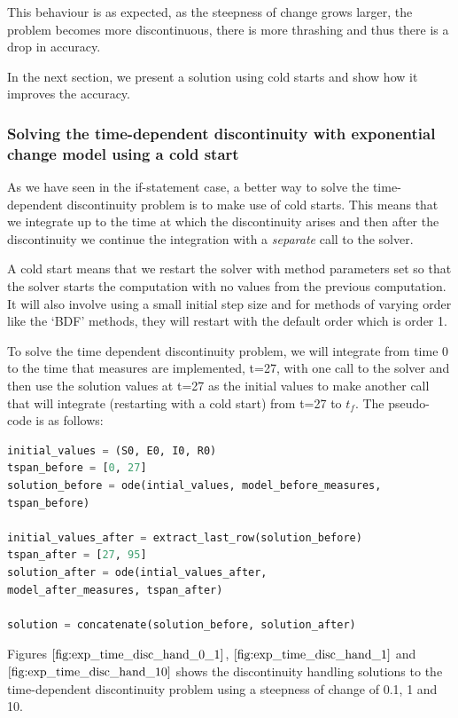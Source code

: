 This behaviour is as expected, as the steepness of change grows larger, the problem becomes more discontinuous, there is more thrashing and thus there is a drop in accuracy.

In the next section, we present a solution using cold starts and show how it improves the accuracy.


\subsubsection{Solving the time-dependent discontinuity with exponential change model using a cold start}
As we have seen in the if-statement case, a better way to solve the time-dependent discontinuity problem is to make use of cold starts. This means that we integrate up to the time at which the discontinuity arises and then after the discontinuity we continue the integration with a \emph{separate} call to the solver. 

A cold start means that we restart the solver with method parameters set so that the solver starts the computation with no values from the previous computation. It will also involve using a small initial step size and for methods of varying order like the `BDF' methods, they will restart with the default order which is order 1.

To solve the time dependent discontinuity problem, we will integrate from time 0 to the time that measures are implemented, t=27, with one call to the solver and then use the solution values at t=27 as the initial values to make another call that will integrate (restarting with a cold start) from t=27 to $t_f$. The pseudo-code is as follows:

\begin{minipage}{\linewidth}
\begin{lstlisting}[language=Python]
initial_values = (S0, E0, I0, R0)
tspan_before = [0, 27]
solution_before = ode(intial_values, model_before_measures,
tspan_before)

initial_values_after = extract_last_row(solution_before)
tspan_after = [27, 95]
solution_after = ode(intial_values_after, 
model_after_measures, tspan_after)

solution = concatenate(solution_before, solution_after)
\end{lstlisting}
\end{minipage}

Figures $\ref{fig:exp_time_disc_hand_0_1}$, $\ref{fig:exp_time_disc_hand_1}$ and $\ref{fig:exp_time_disc_hand_10}$ shows the discontinuity handling solutions to the time-dependent discontinuity problem using a steepness of change of 0.1, 1 and 10.

